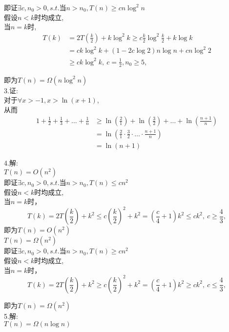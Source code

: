\documentclass{article}
\begin{document}
即证\(\exists c,n_{0} > 0,s.t.当n > n_{0},T(n) \geq cn\log^{2}n\)\\
假设\(n < k\)时均成立,\\
当\(n = k\)时, \[\begin{aligned}
T(k) & = 2T\left( \frac{k}{2} \right) + k\log^{2}k \geq c\frac{k}{2}\log^{2}\frac{k}{2} + k\log k \\
 & = ck\log^{2}k + \left( 1 - 2c\log 2 \right)n\log n + cn\log^{2}2 \\
 & \geq ck\log^{2}k,\ c = \frac{1}{2},n_{0} \geq 5,
\end{aligned}\]

即为\(T(n) = \Omega(n\log^{2}n)\)\\
3.证:\\
对于\(\forall x > - 1,x > \ln(x + 1)\),\\
从而 \[\begin{aligned}
1 + \frac{1}{2} + \frac{1}{3} + \ldots + \frac{1}{n} & \geq \ln(\frac{2}{1}) + \ln(\frac{3}{2}) + \ldots + \ln(\frac{n + 1}{n}) \\
 & = \ln(\frac{2}{1} \cdot \frac{3}{2} \cdot \ldots \cdot \frac{n + 1}{n}) \\
 & = \ln(n + 1)
\end{aligned}\]

4.解:\\
\(T(n) = O\left( n^{2} \right)\)\\
即证\(\exists c,n_{0} > 0,s.t.当n > n_{0},T(n) \leq cn^{2}\)\\

假设\(n < k\)时均成立,\\
当\(n = k\)时，\\
\[T(k) = 2T\left( \frac{k}{2} \right) + k^{2} \leq c\left( \frac{k}{2} \right)^{2} + k^{2} = \left( \frac{c}{4} + 1 \right)k^{2} \leq ck^{2},\ c \geq \frac{4}{3},\]
即为\(T(n) = O\left( n^{2} \right)\)\\
\(T(n) = \Omega(n^{2})\)\\

即证\(\exists c,n_{0} > 0,s.t.当n > n_{0},T(n) \geq cn^{2}\)\\
假设\(n < k\)时均成立,\\
当\(n = k\)时，\\
\[T(k) = 2T\left( \frac{k}{2} \right) + k^{2} \geq c\left( \frac{k}{2} \right)^{2} + k^{2} = \left( \frac{c}{4} + 1 \right)k^{2} \geq ck^{2},\ c \leq \frac{4}{3},\]

即为\(T(n) = \Omega(n^{2})\)\\
5.解:\\
\(T(n) = \Omega(n\log n)\)\\
\end{document}
